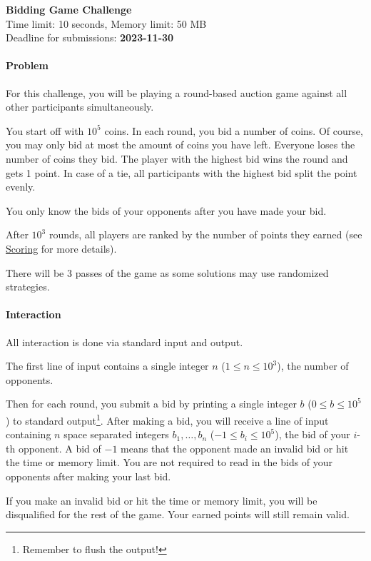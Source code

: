 \documentclass[
    a4paper,
    12pt,
    parskip=half,
    headings=standardclasses,
    footskip=0pt,
    footlines=1,
    headheight=80in
]{scrartcl}
\begin{document}
\begin{center}
    {\LARGE\textbf{Bidding Game Challenge}}\\[6pt]
    Time limit: 10 seconds, Memory limit: 50 MB\\
    {\small Deadline for submissions: \textbf{2023-11-30}}
\end{center}

\paragraph*{Problem}

For this challenge, you will be playing a round-based auction game against all
other participants simultaneously.

You start off with $10^5$ coins. In each round, you bid a number of coins.
Of course, you may only bid at most the amount of coins you have left.
Everyone loses the number of coins they bid.
The player with the highest bid wins the round and gets 1 point. In case of a tie, all participants with the highest bid
split the point evenly.

You only know the bids of your opponents after you have made your bid.

After $10^3$ rounds, all players are ranked by the
number of points they earned (see \hyperref[scoring]{Scoring} for more details).

There will be 3 passes of the game as some solutions may use
randomized strategies.

\paragraph*{Interaction} All interaction is done via standard input and output.

The first line of input contains a single integer $n$ ($1 \leq n \leq 10^3$),
the number of opponents.

Then for each round, you submit a bid by printing a single integer $b$ ($0 \leq
    b \leq 10^5$) to standard output\footnote{Remember to flush the output!}. After
making a bid, you will receive a line of input containing $n$ space separated
integers $b_1, \ldots, b_n$ ($-1 \leq b_i \leq 10^5$), the bid of your $i$-th
opponent. A bid of $-1$ means that the opponent made an invalid bid or hit the
time or memory limit. You are not required to read in the bids of your opponents after
making your last bid.

If you make an invalid bid or hit the time or memory limit, you will be
disqualified for the rest of the game. Your earned points will still remain valid.
\end{document}
